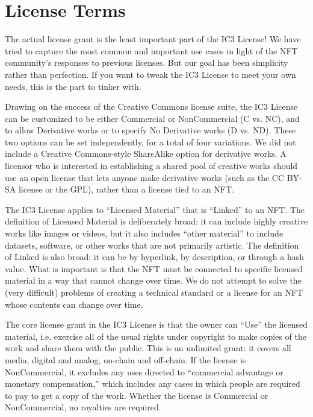 \documentclass{article}
\begin{document}
\section{License Terms}

The actual license grant is the least important part of the IC3 License! We have tried to capture the most common and important use cases in light of the NFT community's responses to previous licenses. But our goal has been simplicity rather than perfection. If you want to tweak the IC3 License to meet your own needs, this is the part to tinker with.

Drawing on the success of the Creative Commons license suite, the IC3 License can be customized to be either Commercial or NonCommercial (C vs. NC), and to allow Derivative works or to specify No Derivative works (D vs. ND). These two options can be set independently, for a total of four variations. We did not include a Creative Commons-style ShareAlike option for derivative works. A licensor who is interested in establishing a shared pool of creative works should use an open license that lets anyone make derivative works (such as the CC BY-SA license or the GPL), rather than a license tied to an NFT.

The IC3 License applies to ``Licensed Material'' that is ``Linked'' to an NFT. The definition of Licensed Material is deliberately broad: it can include highly creative works like images or videos, but it also includes ``other material'' to include datasets, software, or other works that are not primarily artistic. The definition of Linked is also broad: it can be by hyperlink, by description, or through a hash value. What is important is that the NFT must be connected to specific licensed material in a way that cannot change over time. We do not attempt to solve the (very difficult) problems of creating a technical standard or a license for an NFT whose contents can change over time.

The core license grant in the IC3 License is that the owner can ``Use'' the licensed material, i.e. exercise all of the usual rights under copyright to make copies of the work and share them with the public. This is an unlimited grant: it covers all media, digital and analog, on-chain and off-chain. If the license is NonCommercial, it excludes any uses directed to ``commercial advantage or monetary compensation,'' which includes any cases in which people are required to pay to get a copy of the work. Whether the license is Commercial or NonCommercial, no royalties are required.
\end{document}
